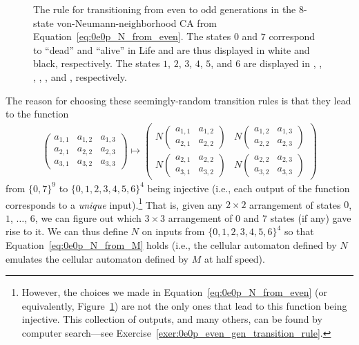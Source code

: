 \begin{figure}[!htb]
	\caption{The rule for transitioning from even to odd generations in the $8$-state von-Neumann-neighborhood CA from Equation~\eqref{eq:0e0p_N_from_even}. The states $0$ and $7$ correspond to ``dead'' and ``alive'' in Life and are thus displayed in white and black, respectively. The states $1$, $2$, $3$, $4$, $5$, and $6$ are displayed in , , , , , and , respectively.}\label{fig:0e0p_rule_em}
\end{figure}

The reason for choosing these seemingly-random transition rules is that they lead to the function
\begin{align}\label{eq:0e0p_injective_transition}
	\begin{pmatrix}
		a_{1,1} & a_{1,2} & a_{1,3} \\
		a_{2,1} & a_{2,2} & a_{2,3} \\
		a_{3,1} & a_{3,2} & a_{3,3}
	\end{pmatrix} \mapsto \begin{pmatrix}
		N\begin{pmatrix}
		a_{1,1} & a_{1,2} \\
		a_{2,1} & a_{2,2}
		\end{pmatrix} & N\begin{pmatrix}
		a_{1,2} & a_{1,3} \\
		a_{2,2} & a_{2,3}
		\end{pmatrix} \\
		N\begin{pmatrix}
		a_{2,1} & a_{2,2} \\
		a_{3,1} & a_{3,2}
		\end{pmatrix} & N\begin{pmatrix}
		a_{2,2} & a_{2,3} \\
		a_{3,2} & a_{3,3}
		\end{pmatrix}
	\end{pmatrix}
\end{align}
from $\{0,7\}^9$ to $\{0,1,2,3,4,5,6\}^4$ being injective (i.e., each output of the function corresponds to a \emph{unique} input).\footnote{However, the choices we made in Equation~\eqref{eq:0e0p_N_from_even} (or equivalently, Figure~\ref{fig:0e0p_rule_em}) are not the only ones that lead to this function being injective. This collection of outputs, and many others, can be found by computer search---see Exercise~\ref{exer:0e0p_even_gen_transition_rule}.} That is, given any $2 \times 2$ arrangement of states $0$, $1$, $\ldots$, $6$, we can figure out which $3 \times 3$ arrangement of $0$ and $7$ states (if any) gave rise to it. We can thus define $N$ on inputs from $\{0,1,2,3,4,5,6\}^4$ so that Equation~\eqref{eq:0e0p_N_from_M} holds (i.e., the cellular automaton defined by $N$ emulates the cellular automaton defined by $M$ at half speed).

